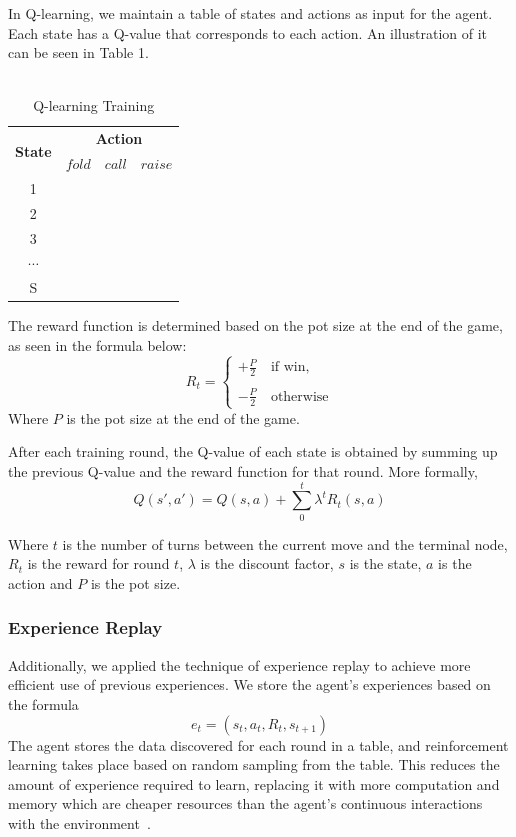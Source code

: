 \documentclass{article}
\begin{document}
In Q-learning, we maintain a table of states and actions as input for the agent. Each state has a Q-value that corresponds to each action. An illustration of it can be seen in Table 1. \\ \\

\begin{table}[h!]
  \begin{center}
	\begin{tabular}{ c|c|c|c }
	\hline
	\multirow{2}{*}{\textbf{State}}&\multicolumn{3}{|c}{\textbf{Action}}\\
	\cline{2-4}
	& $fold$ & $call$ & $raise$\\ 
	\hline
	1\\
	2\\ 
	3\\ 
	$\cdots$\\
	S\\
	\hline
	\end{tabular}
	\caption{Q-learning Training}
    \label{tab:table1}
  \end{center}
\end{table}
The reward function is determined based on the pot size at the end of the game, as seen in the formula below:
\begin{displaymath}
  R_t=
  \left\lbrace
  \begin{array}{l}
    +\frac{P}{2}\quad\text{if win,} \\
    \\
    -\frac{P}{2}\quad\text{otherwise}
  \end{array}
  \right.
\end{displaymath}
\noindent Where $P$ is the pot size at the end of the game.

After each training round, the Q-value of each state  is obtained by summing up the previous Q-value and the reward function for that round. More formally,
\begin{displaymath}
Q\left(s',a'\right)=Q\left(s,a\right)+\sum_{0}^{t}\lambda^{t}R_t\left(s,a\right)
\end{displaymath}

\noindent Where $t$ is the number of turns between the current move and the terminal node, $R_t$ is the reward for round $t$, $\lambda$ is the discount factor, $s$ is the state, $a$ is the action and $P$ is the pot size.

\subsubsection{Experience Replay}
Additionally, we applied the technique of experience replay to achieve more efficient use of previous experiences. We store the agent's experiences based on the formula
\begin{displaymath}
e_t=\left(s_t,a_t,R_t,s_{t+1}\right)
\end{displaymath}
The agent stores the data discovered for each round in a table, and reinforcement learning takes place based on random sampling from the table. This reduces the amount of experience required to learn, replacing it with more computation and memory which are cheaper resources than the agent's continuous interactions with the environment~\cite{sqas:replay}.
\end{document}
